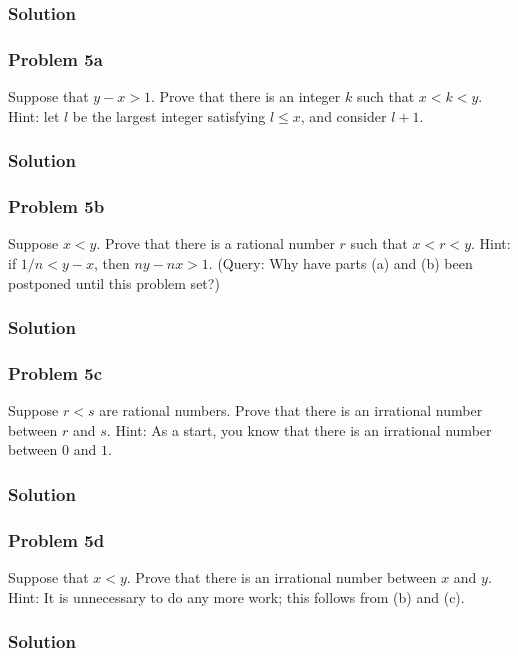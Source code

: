 \subsubsection*{Solution}

\subsubsection*{Problem 5a}
Suppose that $y-x>1$. Prove that there is an integer $k$ such that
$x<k<y$. Hint: let $l$ be the largest integer satisfying $l\leq x$, and
consider $l+1$.

\subsubsection*{Solution}

\subsubsection*{Problem 5b}
Suppose $x<y$. Prove that there is a rational number $r$ such that
$x<r<y$. Hint: if $1/n<y-x$, then $ny-nx>1$. (Query: Why have parts
(a) and (b) been postponed until this problem set?)

\subsubsection*{Solution}

\subsubsection*{Problem 5c}
Suppose $r<s$ are rational numbers. Prove that there is an irrational
number between $r$ and $s$. Hint: As a start, you know that there is
an irrational number between $0$ and $1$.

\subsubsection*{Solution}

\subsubsection*{Problem 5d}
Suppose that $x<y$. Prove that there is an irrational number between
$x$ and $y$. Hint: It is unnecessary to do any more work; this follows
from (b) and (c).

\subsubsection*{Solution}

